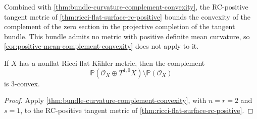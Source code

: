 Combined with \cref{thm:bundle-curvature-complement-convexity}, the RC-positive tangent metric of \cref{thm:ricci-flat-surface-rc-positive} bounds the convexity of the complement of the zero section in the projective completion of the tangent bundle. This bundle admits no metric with positive definite mean curvature, so \cref{cor:positive-mean-complement-convexity} does not apply to it.

\begin{corollary}\label{cor:ricci-flat-tangent-complement-convexity}
If $X$ has a nonflat Ricci-flat K\"ahler metric, then the complement
\[
 \mathbb P(\mathcal O_X\oplus T^{1,0}X)\setminus\mathbb P(\mathcal O_X)
\]
is $3$-convex.
\end{corollary}
\begin{proof}
Apply \cref{thm:bundle-curvature-complement-convexity}, with $n=r=2$ and $s=1$, to the RC-positive tangent metric of \cref{thm:ricci-flat-surface-rc-positive}.
\end{proof}
